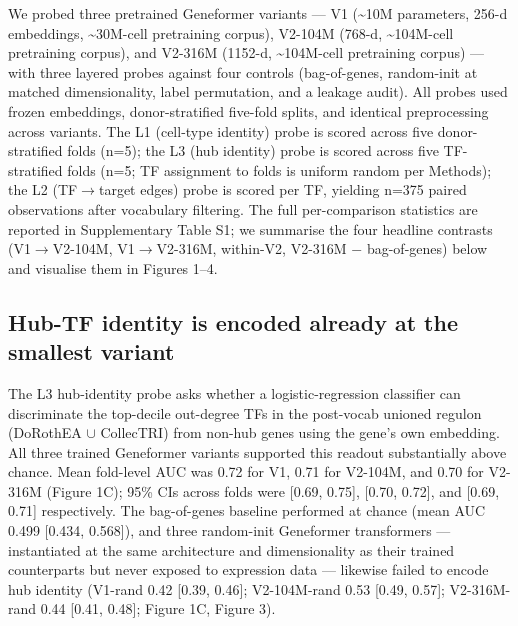 \documentclass[
  11pt,
]{article}
\begin{document}
We probed three pretrained Geneformer variants --- V1
(\textasciitilde10M parameters, 256-d embeddings,
\textasciitilde30M-cell pretraining corpus), V2-104M (768-d,
\textasciitilde104M-cell pretraining corpus), and V2-316M (1152-d,
\textasciitilde104M-cell pretraining corpus) --- with three layered
probes against four controls (bag-of-genes, random-init at matched
dimensionality, label permutation, and a leakage audit). All probes used
frozen embeddings, donor-stratified five-fold splits, and identical
preprocessing across variants. The L1 (cell-type identity) probe is
scored across five donor-stratified folds (n=5); the L3 (hub identity)
probe is scored across five TF-stratified folds (n=5; TF assignment to
folds is uniform random per Methods); the L2 (TF$\to$target edges) probe is
scored per TF, yielding n=375 paired observations after vocabulary
filtering. The full per-comparison statistics are reported in
Supplementary Table S1; we summarise the four headline contrasts
(V1$\to$V2-104M, V1$\to$V2-316M, within-V2, V2-316M $-$ bag-of-genes) below and
visualise them in Figures 1--4.

\subsection{Hub-TF identity is encoded already at the smallest
variant}\label{hub-tf-identity-is-encoded-already-at-the-smallest-variant}

The L3 hub-identity probe asks whether a logistic-regression classifier
can discriminate the top-decile out-degree TFs in the post-vocab
unioned regulon (DoRothEA $\cup$ CollecTRI) from non-hub genes using the gene's own embedding. All
three trained Geneformer variants supported this readout substantially
above chance. Mean fold-level AUC was 0.72 for V1, 0.71 for V2-104M, and
0.70 for V2-316M (Figure 1C); 95\% CIs across folds were {[}0.69,
0.75{]}, {[}0.70, 0.72{]}, and {[}0.69, 0.71{]} respectively. The
bag-of-genes baseline performed at chance (mean AUC 0.499 {[}0.434,
0.568{]}), and three random-init Geneformer transformers ---
instantiated at the same architecture and dimensionality as their
trained counterparts but never exposed to expression data --- likewise
failed to encode hub identity (V1-rand 0.42 {[}0.39, 0.46{]};
V2-104M-rand 0.53 {[}0.49, 0.57{]}; V2-316M-rand 0.44 {[}0.41, 0.48{]};
Figure 1C, Figure 3).
\end{document}
